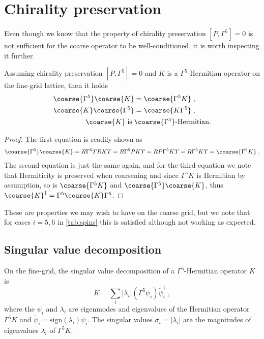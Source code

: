 \section{Chirality preservation}

Even though we know that the property of chirality preservation $[P, \Gamma^{5}]=0$ is not sufficient for the coarse operator to be well-conditioned, it is worth inspecting it further.

\begin{lemma} \label{lemma:chirality:preservation:implications}
Assuming chirality preservation $[P, \Gamma^{5}]=0$ and $K$ is a $\Gamma^{5}$-Hermitian operator on the fine-grid lattice, then it holds
\begin{align}
\coarse{\Gamma^{5}} \coarse{K} &= \coarse{\Gamma^{5} K} \;, \\
\coarse{K} \coarse{\Gamma^{5}} &= \coarse{K \Gamma^{5}} \;, \\
\coarse{K} \; \text{is} \; &\coarse{\Gamma^{5}} \text{-Hermitian.}
\end{align}
\end{lemma}

\begin{proof}
The first equation is readily shown as
\begin{align}
\coarse{\Gamma^{5}} \coarse{K} = R \Gamma^{5} T R K T = R \Gamma^{5} P K T = R P \Gamma^{5} K T = R \Gamma^{5} K T = \coarse{\Gamma^{5} K} \;.
\end{align}
The second equation is just the same again, and for the third equation we note that Hermiticity is preserved when coarsening and since $\Gamma^{5} K$ is Hermitian by assumption, so is $\coarse{\Gamma^{5} K}$ and $\coarse{\Gamma^{5}} \coarse{K}$, thus $\coarse{K}^{\dagger} = \Gamma^{5} \coarse{K} \Gamma^{5}$.
\end{proof}

These are properties we may wish to have on the coarse grid, but we note that for cases $i=5,6$ in \cref{tab:spins} this is satisfied  although not working as expected.

\subsection{Singular value decomposition}

On the fine-grid, the singular value decomposition of a $\Gamma^{5}$-Hermitian operator $K$ is
\begin{equation} \label{eq:svd}
K = \sum_{i} \lvert \lambda_i \rvert (\Gamma^{5} \psi_i) \tilde{\psi}_i^{\dagger} \;,
\end{equation}
where the $\psi_i$ and $\lambda_i$ are eigenmodes and eigenvalues of the Hermitian operator $\Gamma^{5} K$ and $\tilde{\psi}_i = \text{sign}(\lambda_i) \psi_i$.
The singular values $\sigma_i = \lvert \lambda_i \rvert$ are the magnitudes of eigenvalues $\lambda_i$ of $\Gamma^{5} K$.

